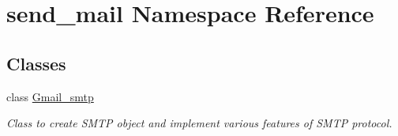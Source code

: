 \hypertarget{namespacesend__mail}{}\section{send\+\_\+mail Namespace Reference}
\label{namespacesend__mail}
\subsection*{Classes}
\begin{DoxyCompactItemize}
\item 
class \hyperlink{classsend__mail_1_1Gmail__smtp}{Gmail\+\_\+smtp}
\begin{DoxyCompactList}\small\item\em Class to create S\+M\+TP object and implement various features of S\+M\+TP protocol. \end{DoxyCompactList}\end{DoxyCompactItemize}

